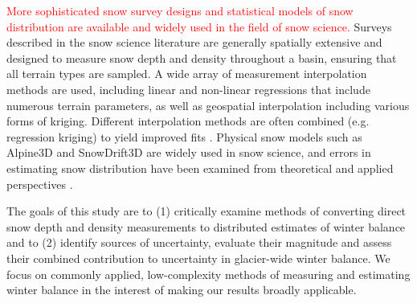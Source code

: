\documentclass[review,oneside, letterpaper]{igs}
\begin{document}
\textcolor{red}{More sophisticated snow survey designs and statistical models of snow distribution are available and widely used in the field of snow science.} Surveys described in the snow science literature are generally spatially extensive and designed to measure snow depth and density throughout a basin, ensuring that all terrain types are sampled. A wide array of measurement interpolation methods are used, including linear \citep[e.g.][]{Lopez2010} and non-linear regressions \citep[e.g.][]{Molotch2005} that include numerous terrain parameters, as well as geospatial interpolation \citep[e.g.][]{Erxleben2002} including various forms of  kriging. Different interpolation methods are often combined (e.g. regression kriging) to yield improved fits \citep[e.g.][]{Balk2000}. Physical snow models such as Alpine3D \citep{Lehning2006} and SnowDrift3D \citep{Schneiderbauer2011} are widely used in snow science, and errors in estimating snow distribution have been examined from theoretical \citep[e.g.][]{Trujillo2015} and applied perspectives \citep[e.g.][]{Turcan1975,Woo1978, Deems2006}. 

The goals of this study are to (1) critically examine methods of converting direct snow depth and density measurements to distributed estimates of winter balance and to (2) identify sources of uncertainty, evaluate their magnitude and assess their combined contribution to uncertainty in glacier-wide winter balance. We focus on commonly applied, low-complexity methods of measuring and estimating winter balance in the interest of making our results broadly applicable.
\end{document}

